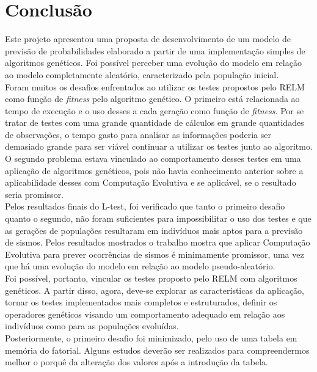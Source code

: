 \chapter{Conclusão}\label{chapter8}
Este projeto apresentou uma proposta de desenvolvimento de um modelo de previsão de probabilidades elaborado a partir de uma implementação simples de algoritmos genéticos. Foi possível perceber uma evolução do modelo em relação ao modelo completamente aleatório, caracterizado pela população inicial.\\

Foram muitos os desafios enfrentados ao utilizar os testes propostos pelo RELM como função de {\it fitness} pelo algoritmo genético. O primeiro está relacionada ao tempo de execução e o uso desses a cada geração como função de {\it fitness}. Por se tratar de testes com uma grande quantidade de cálculos em grande quantidades de observações, o tempo gasto para analisar as informações poderia ser demasiado grande para ser viável continuar a utilizar os testes junto ao algoritmo. O segundo problema estava vinculado ao comportamento desses testes em uma aplicação de algoritmos genéticos, pois não havia conhecimento anterior sobre a aplicabilidade desses com Computação Evolutiva e se aplicável, se o resultado seria promissor.\\

Pelos resultados finais do L-test, foi verificado que tanto o primeiro desafio quanto o segundo, não foram suficientes para impossibilitar o uso dos testes e que as gerações de populações resultaram em indivíduos mais aptos para a previsão de sismos. Pelos resultados mostrados o trabalho mostra que aplicar Computação Evolutiva para prever ocorrências de sismos é minimamente promissor, uma vez que há uma evolução do modelo em relação ao modelo pseudo-aleatório.\\

Foi possível, portanto, vincular os testes proposto pelo RELM com algoritmos genéticos. A partir disso, agora, deve-se explorar as características da aplicação, tornar os testes implementados mais completos e estruturados, definir os operadores genéticos visando um comportamento adequado em relação aos indivíduos como para as populações evoluídas.\\

Posteriormente, o primeiro desafio foi minimizado, pelo uso de uma tabela em memória do fatorial. Alguns estudos deverão ser realizados para compreendermos melhor o porquê da alteração dos valores após a introdução da tabela.\\

